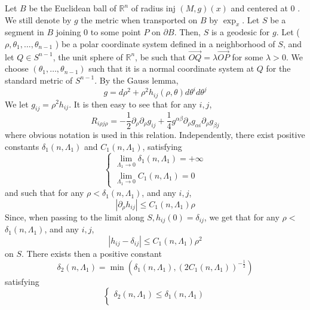 \documentclass[12pt,hyperref,a4paper,UTF8]{ctexart}
\begin{document}
\begin{Proof}
Let $B$ be the Euclidean ball of $\mathbb{R}^n$ of radius inj $(M, g)(x)$ and centered at 0 . We still denote by $g$ the metric when transported on $B$ by $\exp _x$. Let $S$ be a segment in $B$ joining 0 to some point $P$ on $\partial B$. Then, $S$ is a geodesic for $g$. Let ( $\rho, \theta_1, \ldots, \theta_{n-1}$ ) be a polar coordinate system defined in a neighborhood of $S$, and let $Q \in S^{n-1}$, the unit sphere of $\mathbb{R}^n$, be such that $\overrightarrow{O Q}=\lambda \overrightarrow{O P}$ for some $\lambda>0$. We choose $\left(\theta_1, \ldots, \theta_{n-1}\right)$ such that it is a normal coordinate system at $Q$ for the standard metric of $S^{n-1}$. By the Gauss lemma,
$$
g=d \rho^2+\rho^2 h_{i j}(\rho, \theta) d \theta^i d \theta^j
$$
We let $g_{i j}=\rho^2 h_{i j}$. It is then easy to see that for any $i, j$,
\begin{equation}
R_{i \rho j \rho}=-\frac{1}{2} \partial_\rho \partial_\rho g_{i j}+\frac{1}{4} g^{\alpha \beta} \partial_\rho g_{\alpha i} \partial_\rho g_{\beta j}
\label{eq3}
\end{equation}
where obvious notation is used in this relation. Independently, there exist positive constants $\delta_1\left(n, \Lambda_1\right)$ and $C_1\left(n, \Lambda_1\right)$, satisfying
$$
\left\{\begin{array}{l}
\lim _{\Lambda_1 \rightarrow 0} \delta_1\left(n, \Lambda_1\right)=+\infty \\
\lim _{\Lambda_1 \rightarrow 0} C_1\left(n, \Lambda_1\right)=0
\end{array}\right.
$$
and such that for any $\rho<\delta_1\left(n, \Lambda_1\right)$, and any $i, j$,
\begin{equation}
\left|\partial_\rho h_{i j}\right| \leq C_1\left(n, \Lambda_1\right) \rho
\label{eq4}
\end{equation}
Since, when passing to the limit along $S, h_{i j}(0)=\delta_{i j}$, we get that for any $\rho<$ $\delta_1\left(n, \Lambda_1\right)$, and any $i, j$,
\begin{equation}
\left|h_{i j}-\delta_{i j}\right| \leq C_1\left(n, \Lambda_1\right) \rho^2
\label{eq5}
\end{equation}
on $S$. There exists then a positive constant
$$
\delta_2\left(n, \Lambda_1\right)=\min \left(\delta_1\left(n, \Lambda_1\right),\left(2 C_1\left(n, \Lambda_1\right)\right)^{-\frac{1}{2}}\right)
$$
satisfying
$$
\left\{\begin{array}{l}
\delta_2\left(n, \Lambda_1\right) \leq \delta_1\left(n, \Lambda_1\right) \\

\end{array}$$
\end{Proof}
\end{document}
